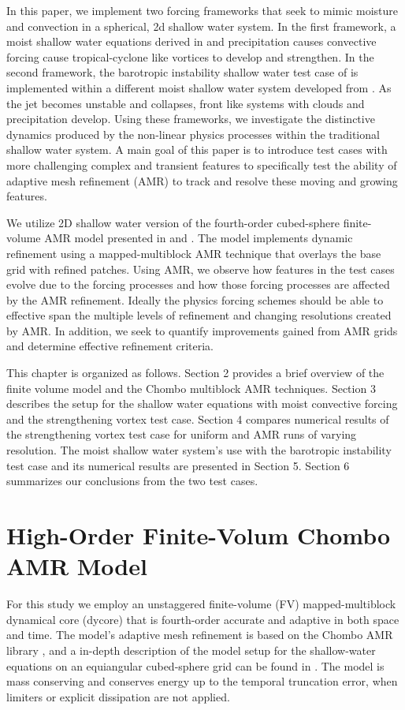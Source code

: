 In this paper, we implement two forcing frameworks that seek to mimic moisture 
and convection in a spherical, 2d shallow water system. In the first framework, 
a moist shallow water equations derived in \cite{bouchut2009fronts} and 
\cite{lahaye2016understanding} precipitation causes
 convective forcing cause tropical-cyclone like vortices to develop and strengthen. In the second 
framework, the barotropic instability shallow water test case of 
\cite{galewsky2004initial} is implemented within a different moist shallow water system developed from 
 \cite{zerroukat2015moist}. As the jet becomes unstable and collapses, front like 
 systems with clouds and precipitation develop. Using these frameworks, we
 investigate the distinctive dynamics produced by the non-linear physics processes
 within the traditional shallow water system. A main goal of this paper is to
 introduce test cases with more challenging complex and transient features
 to specifically test the ability of adaptive mesh refinement (AMR) 
 to track and resolve these moving and growing features.
 
 We utilize 2D shallow water 
 version of the fourth-order cubed-sphere finite-volume AMR model
 presented in \cite{mccorquodale2015adaptive} and
 \cite{ferguson2016analyzing}. The model implements dynamic refinement using
 a mapped-multiblock AMR technique that overlays the base grid with refined patches.
 Using AMR, we observe how features in the test cases evolve due to the forcing 
 processes and how those forcing processes are affected by the AMR refinement. 
Ideally the physics forcing schemes should be able to effective span 
the multiple levels of refinement and changing resolutions created by AMR.
 In addition, we seek to quantify improvements gained from AMR grids
 and determine effective refinement criteria.

This chapter is organized as follows. Section 2 provides a brief overview
of the finite volume model and the Chombo multiblock AMR techniques.
Section 3 describes the setup for the shallow water equations
with moist convective forcing and the strengthening vortex test case.
Section 4 compares numerical results of the strengthening vortex
test case for uniform and AMR runs of varying resolution. The
 \cite{zerroukat2015moist} moist shallow water system's use with
 the barotropic instability test case and its numerical results
 are presented in Section 5.  Section 6 summarizes our
 conclusions from the two test cases.

\section{High-Order Finite-Volum Chombo AMR Model}
  For this study we employ an unstaggered finite-volume (FV) mapped-multiblock dynamical core (dycore) that is fourth-order accurate and adaptive in both space and time. The model's adaptive mesh refinement is based on the Chombo AMR library \citep{Adams:2015gd}, and a in-depth description of the model setup for the shallow-water equations on an equiangular cubed-sphere grid can be found in \cite{mccorquodale2015adaptive}. The model is mass conserving and conserves energy up to the temporal truncation error, when limiters or explicit dissipation are not applied. 
  
